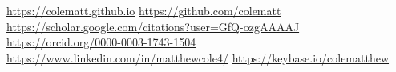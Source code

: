  \url{https://colematt.github.io}
 \url{https://github.com/colematt}
 \url{https://scholar.google.com/citations?user=GfQ-ozgAAAAJ}
 \url{https://orcid.org/0000-0003-1743-1504}
 \url{https://www.linkedin.com/in/matthewcole4/}
 \url{https://keybase.io/colematthew}
